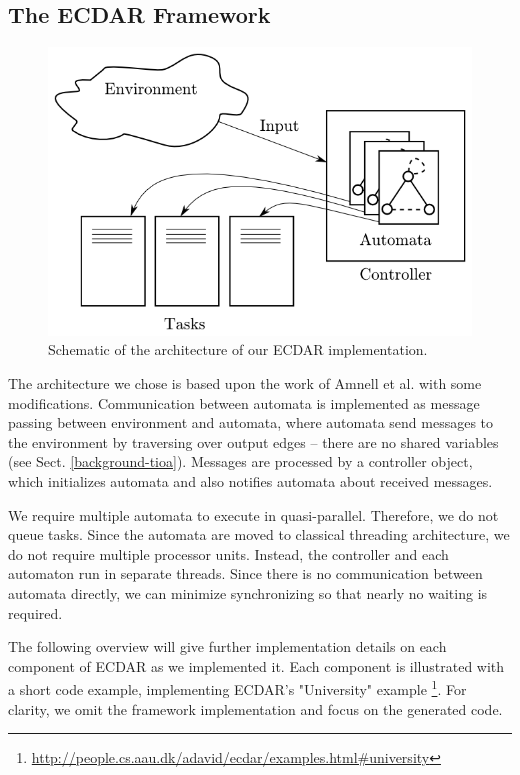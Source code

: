 \subsection{The ECDAR Framework}
\label{implementation-framework}

\begin{figure}[t]
\begin{centering}
\includegraphics[scale=0.5]{images/ecdar_architecture} 
\par\end{centering}

\caption{Schematic of the architecture of our ECDAR implementation.}
\end{figure}

The architecture we chose is based upon the work of Amnell et al.\cite{amnell_code_2002}
with some modifications. Communication between automata is implemented
as message passing between environment and automata, where automata
send messages to the environment by traversing over output edges --
there are no shared variables (see Sect. \ref{background-tioa}). Messages
are processed by a controller object, which initializes automata and
also notifies automata about received messages.

We require multiple automata to execute in quasi-parallel. Therefore,
we do not queue tasks. Since the automata are moved to classical threading
architecture, we do not require multiple processor units. Instead,
the controller and each automaton run in separate threads. Since there
is no communication between automata directly, we can minimize synchronizing
so that nearly no waiting is required.

The following overview will give further implementation details on each
component of ECDAR as we implemented it. Each component is illustrated with a
short code example, implementing ECDAR's "University"
example \footnote{\url{http://people.cs.aau.dk/adavid/ecdar/examples.html\#university}}. For
clarity, we omit the framework implementation and focus on the generated code.

